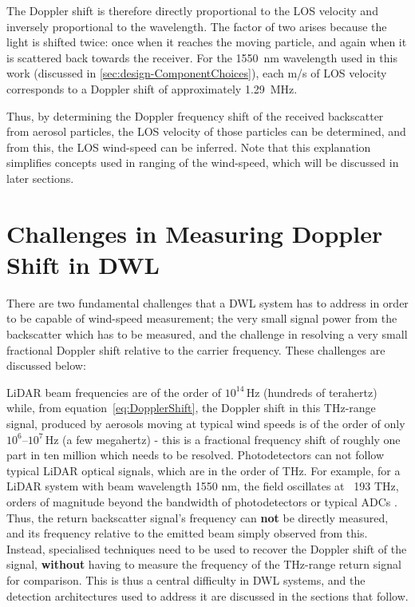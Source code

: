     The Doppler shift is therefore directly proportional to the LOS velocity and inversely
    proportional to the wavelength. The factor of two arises because the light is shifted twice:
    once when it reaches the moving particle, and again when it is scattered back towards the
    receiver. For the \SI{1550}{nm} wavelength used in this work (discussed in \autoref{sec:design-ComponentChoices}), each \si{m/s} of LOS velocity
    corresponds to a Doppler shift of approximately \SI{1.29}{MHz}.

    Thus, by determining the Doppler frequency shift of the received backscatter from aerosol particles, the LOS velocity of those particles can be determined, and from this, the LOS wind-speed can be inferred. Note that this explanation simplifies concepts used in ranging of the wind-speed, which will be discussed in later sections. 

    \section{Challenges in Measuring Doppler Shift in DWL} \label{sec:lit-ChallengesDopplerShift}
    There are two fundamental challenges that a DWL system has to address in order to be capable of wind-speed measurement; the very small signal power from the backscatter which has to be measured, and the challenge in resolving a very small fractional Doppler shift relative to the carrier frequency. These challenges are discussed below:
    
    LiDAR beam frequencies are of the order of
    $10^{14}\,\text{Hz}$ (hundreds of terahertz) while, from
    equation~\ref{eq:DopplerShift}, the Doppler shift in this THz-range signal, produced by
    aerosols moving at typical wind speeds is of the order of only
    $10^{6}\text{--}10^{7}\,\text{Hz}$ (a few megahertz) - this is a fractional frequency shift of
    roughly one part in ten million which needs to be resolved. Photodetectors can not follow typical LiDAR optical signals, which are in the order of THz. For example, for a LiDAR system with beam wavelength 1550 nm, the field oscillates at ~193 THz, orders of magnitude beyond the bandwidth of photodetectors or typical ADCs \cite{abari_all-fiber_2014, hill_remote_nodate}. Thus, the return backscatter signal's frequency can \textbf{not} be directly measured, and its frequency relative to the emitted beam simply observed from this. Instead, specialised techniques need to be used to recover the Doppler shift of the signal, \textbf{without} having to measure the frequency of the THz-range return signal for comparison. This is thus a central difficulty in DWL systems, and the detection architectures used to address it are discussed in the sections that follow.
    
